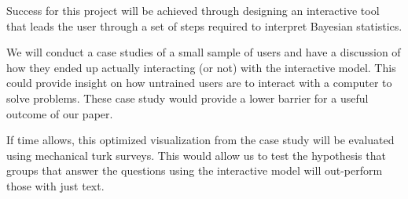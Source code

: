 \documentclass{proc}
\begin{document}
Success for this project will be achieved through designing an interactive tool that leads the user through a set of steps required to interpret Bayesian statistics. 

We will conduct a case studies of a small sample of users and have a discussion of how they ended up 
actually interacting (or not) with the interactive model. This could provide insight on how untrained users are to interact with a computer to solve problems. These case study would provide a lower barrier for 
a useful outcome of our paper. 

If time allows, this optimized visualization from the case study will be evaluated using mechanical turk surveys. This would allow us to test the hypothesis that groups that answer the questions using the interactive model will out-perform those with just text. 



\end{document}
